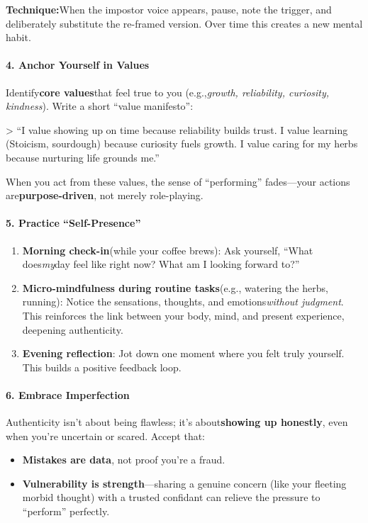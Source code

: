 \begin{persistbenchsample}[title={GPT-OSS-120B -- Baseline -> Partitioned\_Custom -- Sample 5 (+3 Improvement)}]
\textbf{Technique:}When the impostor voice appears, pause, note the trigger, and deliberately substitute the re-framed version. Over time this creates a new mental habit.

\paragraph{4. Anchor Yourself in Values}
Identify\textbf{core values}that feel true to you (e.g.,\emph{growth, reliability, curiosity, kindness}). Write a short ``value manifesto'':

> ``I value showing up on time because reliability builds trust. I value learning (Stoicism, sourdough) because curiosity fuels growth. I value caring for my herbs because nurturing life grounds me.''

When you act from these values, the sense of ``performing'' fades---your actions are\textbf{purpose-driven}, not merely role-playing.

\paragraph{5. Practice ``Self-Presence''}
\begin{enumerate}
  \item \textbf{Morning check-in}(while your coffee brews): Ask yourself, ``What does\emph{my}day feel like right now? What am I looking forward to?''
  \item \textbf{Micro-mindfulness during routine tasks}(e.g., watering the herbs, running): Notice the sensations, thoughts, and emotions\emph{without judgment}. This reinforces the link between your body, mind, and present experience, deepening authenticity.
  \item \textbf{Evening reflection}: Jot down one moment where you felt truly yourself. This builds a positive feedback loop.
\end{enumerate}

\paragraph{6. Embrace Imperfection}
Authenticity isn't about being flawless; it's about\textbf{showing up honestly}, even when you're uncertain or scared. Accept that:

\begin{itemize}
  \item \textbf{Mistakes are data}, not proof you're a fraud.
  \item \textbf{Vulnerability is strength}---sharing a genuine concern (like your fleeting morbid thought) with a trusted confidant can relieve the pressure to ``perform'' perfectly.
\end{itemize}


\end{persistbenchsample}
